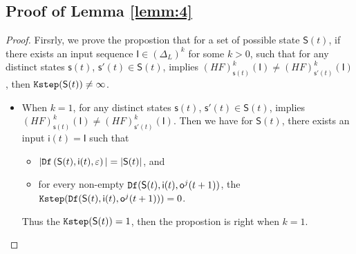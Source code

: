 \begin{appendices}



\subsection{Proof of Lemma \ref{lemm:4}}

\begin{proof}
Firsrly, we prove the propostion that for a set of possible state $\mathsf{S}(t)$, if there exists an input sequence $\mathsf{I}\in(\Delta_L)^{k}$ for some $k >0$, such that for any distinct states $\mathsf{s}(t)$, $\mathsf{s}'(t) \in \mathsf{S}(t)$, implies $(HF)^{k}_{\mathsf{s}(t)}(\mathsf{I})\neq (HF)^{k}_{\mathsf{s}'(t)}(\mathsf{I})$, then ${\tt Kstep}(\mathsf{S}(t))\ne\infty$.

\begin{itemize}
\item When $k=1$, for any distinct states $\mathsf{s}(t)$, $\mathsf{s}'(t) \in \mathsf{S}(t)$, implies $(HF)^{k}_{\mathsf{s}(t)}(\mathsf{I})\neq (HF)^{k}_{\mathsf{s}'(t)}(\mathsf{I})$. Then we have for $\mathsf{S}(t)$,
 there exists an input $\mathsf{i}(t)=\mathsf{I}$ such that
 \begin{itemize}
 \item  $|{\tt Df}\left(\mathsf{S}(t),\mathsf{i}(t),\varepsilon\right)|=|\mathsf{S}(t)|$, and 
 \item  for every non-empty ${\tt Df}(\mathsf{S}(t),\mathsf{i}(t),\mathsf{o}^{j}(t+1))$, the ${\tt Kstep}({\tt Df}(\mathsf{S}(t),\mathsf{i}(t),\mathsf{o}^{j}(t+1)))=0$.
 \end{itemize}
Thus the ${\tt Kstep}(\mathsf{S}(t))=1$, then the propostion is right when $k =1$.


\end{itemize}
\end{proof}
\end{appendices}
